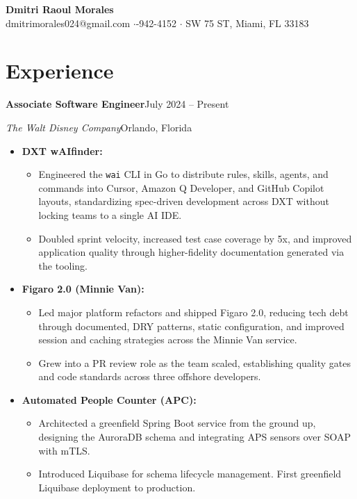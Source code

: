 \documentclass[10pt,letterpaper]{article}
\newcommand{\entry}[2]{%
  \noindent\textbf{#1}\hfill #2\par\vspace{-1pt}%
}
\newcommand{\subentry}[2]{%
  \noindent\textit{#1}\hfill #2\par\vspace{1pt}%
}
\begin{document}
\begin{center}
  {\LARGE \textbf{Dmitri Raoul Morales}}\\[3pt]
  dmitrimorales024@gmail.com \enspace$\cdot$-942-4152 \enspace$\cdot$ SW 75 ST, Miami, FL 33183
\end{center}

\vspace{-0.2em}

\section{Experience}

\entry{Associate Software Engineer}{July 2024 -- Present}
\subentry{The Walt Disney Company}{Orlando, Florida}
\begin{itemize}
  \item \textbf{DXT wAIfinder:}
  \begin{itemize}
    \item Engineered the \texttt{wai} CLI in Go to distribute rules, skills, agents, and commands into Cursor, Amazon Q Developer, and GitHub Copilot layouts, standardizing spec-driven development across DXT without locking teams to a single AI IDE.
    \item Doubled sprint velocity, increased test case coverage by 5x, and improved application quality through higher-fidelity documentation generated via the tooling.
  \end{itemize}
  \item \textbf{Figaro 2.0 (Minnie Van):}
  \begin{itemize}
    \item Led major platform refactors and shipped Figaro 2.0, reducing tech debt through documented, DRY patterns, static configuration, and improved session and caching strategies across the Minnie Van service.
    \item Grew into a PR review role as the team scaled, establishing quality gates and code standards across three offshore developers.
  \end{itemize}
  \item \textbf{Automated People Counter (APC):}
  \begin{itemize}
    \item Architected a greenfield Spring Boot service from the ground up, designing the AuroraDB schema and integrating APS sensors over SOAP with mTLS.
    \item Introduced Liquibase for schema lifecycle management. First greenfield Liquibase deployment to production.

\end{itemize}
\end{itemize}
\end{document}
